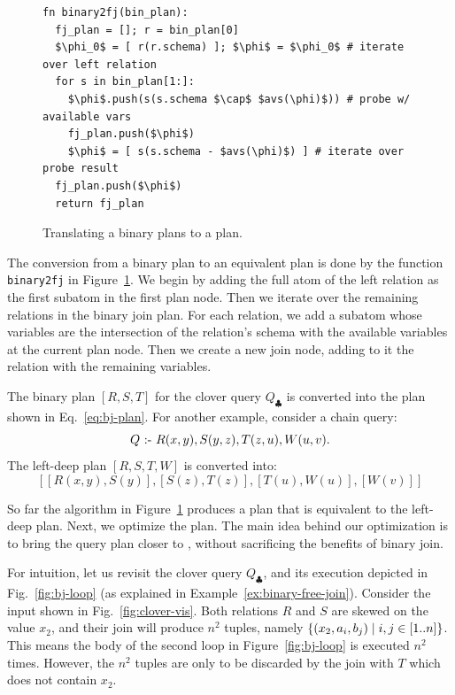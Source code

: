 
\begin{figure}
  \begin{lstlisting}
fn binary2fj(bin_plan):
  fj_plan = []; r = bin_plan[0]
  $\phi_0$ = [ r(r.schema) ]; $\phi$ = $\phi_0$ # iterate over left relation
  for s in bin_plan[1:]:
    $\phi$.push(s(s.schema $\cap$ $avs(\phi)$)) # probe w/ available vars
    fj_plan.push($\phi$)
    $\phi$ = [ s(s.schema - $avs(\phi)$) ] # iterate over probe result
  fj_plan.push($\phi$)
  return fj_plan
  \end{lstlisting}
  \caption{Translating a binary plans to a \FJ plan.}
  \label{fig:bj2fj}
\end{figure}

The conversion from a binary plan to an equivalent \FJ plan is done by the function
\lstinline|binary2fj| in Figure~\ref{fig:bj2fj}.  We begin by adding the full atom of the left
relation as the first subatom in the first \FJ plan node.  Then we iterate over
the remaining relations in the binary join plan.  For each relation, we add a
subatom whose variables are the intersection of the relation's schema with the
available variables at the current \FJ plan node. Then we create a new join
node, adding to it the relation with the remaining variables.  

\begin{example}
  The binary plan $[R, S, T]$ for the clover query $Q_\clubsuit$ is
  converted into the \FJ plan shown in Eq.~\eqref{eq:bj-plan}.  For
  another example, consider a chain query:
$$Q \text{ :- } R(x, y), S(y, z), T(z, u), W(u, v).$$
The left-deep plan $[R, S, T, W]$ is converted into:
$$[[R(x, y), S(y)], [S(z), T(z)], [T(u), W(u)], [W(v)]]$$
\end{example}

So far the algorithm in Figure~\ref{fig:bj2fj} produces a \FJ plan
that is equivalent to the left-deep plan.  Next, we
optimize the \FJ plan. The main idea behind our optimization is to
bring the query plan closer to \GJ, without sacrificing the benefits
of binary join.

For intuition, let us revisit the clover query $Q_\clubsuit$, and its
execution depicted in Fig.~\ref{fig:bj-loop} (as explained in
Example~\ref{ex:binary-free-join}).  Consider the input shown in
Fig.~\ref{fig:clover-vis}.  Both relations $R$ and $S$ are skewed on
the value $x_2$, and their join will produce $n^2$ tuples, namely
$\{{(x_2, a_i, b_j)}\mid{i, j \in [1..n]}\}$.  This means the body of
the second loop in Figure~\ref{fig:bj-loop} is executed $n^2$ times.
However, the $n^2$ tuples are only to be discarded by the join with
$T$ which does not contain $x_2$.

